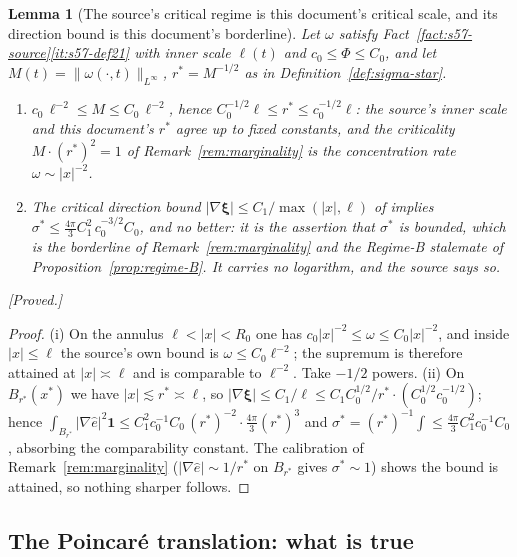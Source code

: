 \documentclass[11pt]{article}
\newtheorem{lemma}[theorem]{Lemma}
\theoremstyle{definition}
\theoremstyle{remark}
\begin{document}
\begin{lemma}[The source's critical regime is this document's critical scale,
  and its direction bound is this document's borderline]\label{lem:s57-scale}
  Let $\omega$ satisfy Fact~\ref{fact:s57-source}\ref{it:s57-def21} with inner
  scale $\ell(t)$ and $c_0\leq\Phi\leq C_0$, and let $M(t)=\|\omega(\cdot,t)
  \|_{L^\infty}$, $r^*=M^{-1/2}$ as in Definition~\ref{def:sigma-star}.
  \begin{enumerate}[label=\textup{(\roman*)},leftmargin=2.6em]
  \item $c_0\,\ell^{-2}\leq M\leq C_0\,\ell^{-2}$, hence
    $C_0^{-1/2}\ell\leq r^*\leq c_0^{-1/2}\ell$: the source's inner scale and
    this document's $r^*$ agree up to fixed constants, and the criticality
    $M\cdot(r^*)^2=1$ of Remark~\ref{rem:marginality} \emph{is} the
    concentration rate $\omega\sim|x|^{-2}$.
  \item The critical direction bound
    $|\nabla\boldsymbol\xi|\leq C_1/\max(|x|,\ell)$ of
    \cite[Def.~3.1(6)]{Grujic2026Decay} implies
    $\sigma^*\leq \tfrac{4\pi}{3}C_1^2\,c_0^{-3/2}C_0$, and no better: it is
    the assertion that $\sigma^*$ is \emph{bounded}, which is the borderline
    of Remark~\ref{rem:marginality} and the Regime-B stalemate of
    Proposition~\ref{prop:regime-B}. It carries no logarithm, and the source
    says so.
  \end{enumerate}
  \emph{[Proved.]}
\end{lemma}
\begin{proof}
  (i) On the annulus $\ell<|x|<R_0$ one has $c_0|x|^{-2}\leq\omega\leq
  C_0|x|^{-2}$, and inside $|x|\leq\ell$ the source's own bound is
  $\omega\leq C_0\ell^{-2}$; the supremum is therefore attained at $|x|\asymp
  \ell$ and is comparable to $\ell^{-2}$. Take $-1/2$ powers.
  (ii) On $B_{r^*}(x^*)$ we have $|x|\lesssim r^*\asymp\ell$, so
  $|\nabla\boldsymbol\xi|\leq C_1/\ell\leq C_1C_0^{1/2}/r^*\cdot
  (C_0^{1/2}c_0^{-1/2})$; hence
  $\int_{B_{r^*}}|\nabla\hat e|^2\mathbf 1\leq
  C_1^2c_0^{-1}C_0\,(r^*)^{-2}\cdot\tfrac{4\pi}{3}(r^*)^3$ and
  $\sigma^*=(r^*)^{-1}\int\leq\tfrac{4\pi}{3}C_1^2c_0^{-1}C_0$, absorbing the
  comparability constant. The calibration of Remark~\ref{rem:marginality}
  ($|\nabla\hat e|\sim1/r^*$ on $B_{r^*}$ gives $\sigma^*\sim1$) shows the
  bound is attained, so nothing sharper follows.
\end{proof}

\subsection{The Poincar\'e translation: what is true}
\label{subsec:s57-poincare}
\end{document}
